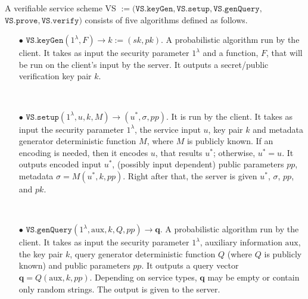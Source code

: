 \begin{definition}[VS Scheme]\label{service-def}
A verifiable service scheme VS $:=(\mathtt{VS.keyGen}, \mathtt{VS.setup},\mathtt{VS.genQuery},$ $\mathtt{VS.prove},\mathtt{VS.verify})$ consists of five algorithms defined as follows.


\begin{itemize}

\item[$\bullet$] $\mathtt{VS.keyGen}(1^{\lambda},F)\rightarrow k:=(sk,pk)$.  A probabilistic algorithm run by the client. It takes as input the security parameter $1^{\lambda}$ and a function, $F$, that will be run on the client's input by the server. It outputs a secret/public verification key pair $k$. 


\

\item[$\bullet$] $\mathtt{VS.setup}(1^{\lambda}, u,k, M)\rightarrow (u^{\scriptscriptstyle *},\sigma,{pp})$. It is run by the client. It takes as input the security parameter $1^{\lambda}$,  the service input $u$,    key pair $k$ and metadata generator deterministic function $M$, where $M$ is publicly known. If an encoding is needed, then it encodes $u$, that results $u^{\scriptscriptstyle *}$; otherwise, $u^*=u$. It outputs encoded input $u^{\scriptscriptstyle *}$, (possibly input dependent) public parameters {$pp$}, metadata $\sigma=M(u^{\scriptscriptstyle *},k,{pp})$. Right after that, the server is  given $u^{\scriptscriptstyle *}$,  $\sigma$, {$pp$}, and $pk$. %



\

\item[$\bullet$] $\mathtt{VS.genQuery}(1^{\lambda}, \text{aux},k,Q,{pp})\rightarrow \bm{q}$. A probabilistic algorithm run by the client. It takes as input the security parameter $1^{\lambda}$, auxiliary information $\text{aux}$,   the key pair $k$,   query generator deterministic function $Q$ (where $Q$ is publicly known) and {public parameters $pp$}. It outputs  a query vector $\bm{q}=Q( \text{aux},k,{pp})$.  Depending on service types, $\bm{q}$ may be empty or contain only random strings. The output  is given to the server. 


\end{itemize}
\end{definition}
